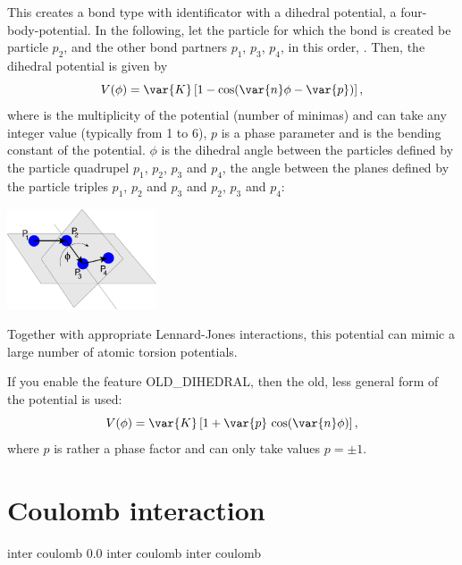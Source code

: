 This creates a bond type with identificator 
with a dihedral potential, \ie a four-body-potential. In the following,
let the particle for which the bond is created be particle $p_2$, and
the other bond partners $p_1$, $p_3$, $p_4$, in this order, \ie
{}. Then, the
dihedral potential is given by
\begin{equation}
  V(\phi) = \var{K}\left[1 - \cos(\var{n}\phi - \var{p})\right],
\end{equation}
where  is the multiplicity of the potential (number of minimas)
and can take any integer value (typically from 1 to 6), $p$ is a phase
parameter and  is the bending constant of the potential. $\phi$
is the dihedral angle between the particles defined by the particle
quadrupel $p_1$, $p_2$, $p_3$ and $p_4$, \ie the angle between the
planes defined by the particle triples $p_1$, $p_2$ and $p_3$ and
$p_2$, $p_3$ and $p_4$:
\begin{center}
  \includegraphics[height=8em]{figures/dihedral-angle}
\end{center}
Together with appropriate Lennard-Jones interactions, this potential
can mimic a large number of atomic torsion potentials.

If you enable the feature OLD_DIHEDRAL, then the old, less
general form of the potential is used:
\begin{equation}
  V(\phi) = \var{K}\left[1 + \var{p}\,\cos(\var{n}\phi)\right],
\end{equation}
where $p$ is rather a phase factor and can only take values $p=\pm 1$.


\section{Coulomb interaction}
\label{sec:inter-electrostatics}

\begin{essyntax}
   inter coulomb 0.0
   inter coulomb
   inter coulomb 
\end{essyntax}

